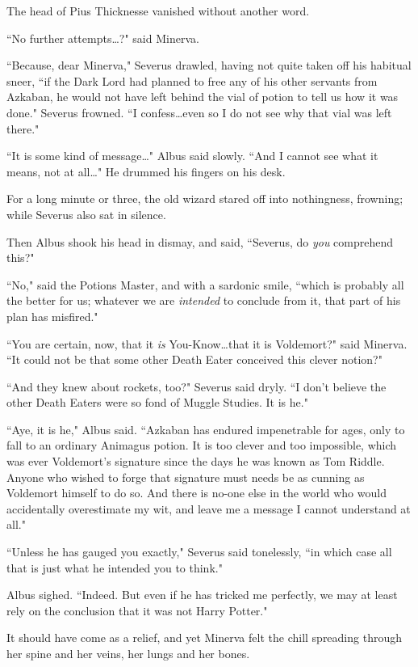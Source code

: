 The head of Pius Thicknesse vanished without another word.

``No further attempts…?" said Minerva.

``Because, dear Minerva," Severus drawled, having not quite taken off his habitual sneer, ``if the Dark Lord had planned to free any of his other servants from Azkaban, he would not have left behind the vial of potion to tell us how it was done." Severus frowned. ``I confess…even so I do not see why that vial was left there."

``It is some kind of message…" Albus said slowly. ``And I cannot see what it means, not at all…" He drummed his fingers on his desk.

For a long minute or three, the old wizard stared off into nothingness, frowning; while Severus also sat in silence.

Then Albus shook his head in dismay, and said, ``Severus, do \emph{you} comprehend this?"

``No," said the Potions Master, and with a sardonic smile, ``which is probably all the better for us; whatever we are \emph{intended} to conclude from it, that part of his plan has misfired."

``You are certain, now, that it \emph{is} You-Know…that it is Voldemort?" said Minerva. ``It could not be that some other Death Eater conceived this clever notion?"

``And they knew about rockets, too?" Severus said dryly. ``I don't believe the other Death Eaters were so fond of Muggle Studies. It is he."

``Aye, it is he," Albus said. ``Azkaban has endured impenetrable for ages, only to fall to an ordinary Animagus potion. It is too clever and too impossible, which was ever Voldemort's signature since the days he was known as Tom Riddle. Anyone who wished to forge that signature must needs %
be as cunning as Voldemort himself to do so. And there is no-one else in the world who would accidentally overestimate my wit, and leave me a message I cannot understand at all."

``Unless he has gauged you exactly," Severus said tonelessly, ``in which case all that is just what he intended you to think."

Albus sighed. ``Indeed. But even if he has tricked me perfectly, we may at least rely on the conclusion that it was not Harry Potter."

It should have come as a relief, and yet Minerva felt the chill spreading through her spine and her veins, her lungs and her bones.

